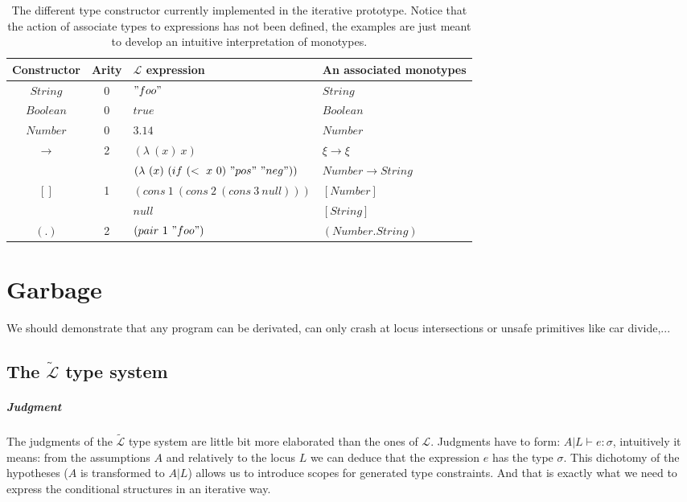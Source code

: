 \documentclass[a4paper]{report}
\newcommand{\lang}[0]{\mathcal{L}}
\newcommand{\locus}[1]{\widetilde{#1}}
\begin{document}
\begin{table}
\centering
\begin{tabular}{|c|c|l|l|}
\hline
Constructor & Arity & $\lang$ expression & An associated monotypes \\
\hline
$String$ & 0 & $"foo"$ & $String$\\
\hline
$Boolean$ & 0 & $true$ & $Boolean$\\
\hline
$Number$ & 0 & $3.14$ & $Number$\\
\hline
$\to$ & 2 & $(\lambda\ (x)\ x)$ & $\xi\to\xi$ \\
& & $(\lambda\ (x)\ (if\ (<\ x\ 0)\ "pos"\ "neg"))$ & $Number\to String$\\
\hline
$[]$ & 1 & $(cons\ 1\ (cons\ 2\ (cons\ 3\ null)))$ & $[Number]$\\
& & $null$ & $[String]$\\
\hline
$(.)$ & 2 & $(pair\ 1\ "foo")$ & $(Number.String)$\\
\hline
\end{tabular}
\caption{The different type constructor currently implemented in the iterative prototype. Notice that the action of associate types to expressions has not been defined, the examples are just meant to develop an intuitive interpretation of monotypes.}
\label{pract_type_constr}
\end{table}


\chapter{Garbage}

We should demonstrate that any program can be derivated, can only crash at locus intersections or unsafe primitives like car divide,... 

\section{The $\locus\lang$ type system}

\paragraph{Judgment} The judgments of the $\locus\lang$ type system are little bit more elaborated than the ones of $\lang$. Judgments have to form: $A|L\vdash e:\sigma$, intuitively it means: from the assumptions $A$ and relatively to the locus $L$ we can deduce that the expression $e$ has the type $\sigma$. This dichotomy of the hypotheses ($A$ is transformed to $A|L$) allows us to introduce scopes for generated type constraints. And that is exactly what we need to express the conditional structures in an iterative way.
\end{document}
